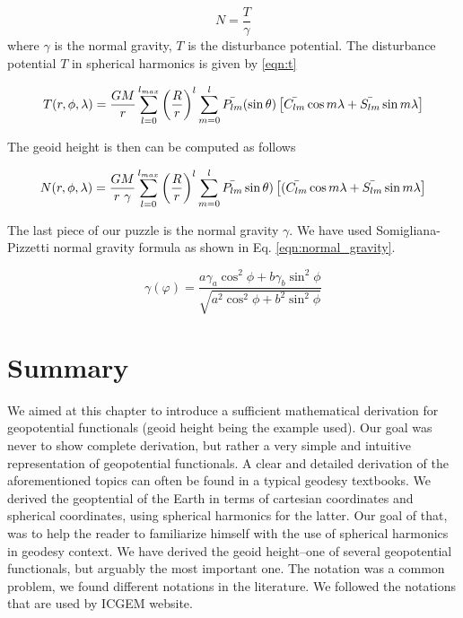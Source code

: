  \begin{equation}
 \label{eqn:brums}
 N = \frac{T}{\gamma}
 \end{equation}
 where $\gamma$ is the normal gravity, $T$ is the disturbance potential. The disturbance potential $T$ in spherical harmonics is given by \ref{eqn:t}
 
 \begin{equation}
 \label{eqn:t}
 T(r, \phi, \lambda) = \frac{GM}{r}\sum_{l=0}^{l_{max}}\left(\frac{R}{r}\right)^{l}\sum_{m=0}^{l}\bar{P_{lm}}(\sin \theta)\left[\bar{C_{lm}} \cos m \lambda \\
 + \bar{S_{lm}} \sin m \lambda\right]
 \end{equation}
 
 The geoid height is then can be computed as follows
 
  \begin{equation}
  \label{eqn:n}
  N(r, \phi, \lambda) = \frac{GM}{r\ \gamma}\sum_{l=0}^{l_{max}}\left(\frac{R}{r}\right)^{l}\sum_{m=0}^{l}\bar{P_{lm}}\sin \theta)\left[(\bar{C_{lm}} \cos m \lambda \\
  + \bar{S_{lm}} \sin m \lambda\right]
  \end{equation}
  
  The last piece of our puzzle is the normal gravity $\gamma$. We have used Somigliana-Pizzetti normal gravity formula as shown in Eq. \ref{eqn:normal_gravity}.
  
  \begin{equation}
  \label{eqn:normal_gravity}
  \gamma(\varphi) = \frac{a \gamma_a \cos^2 \phi + b \gamma_b \sin^2\phi}{\sqrt{a^2 \cos^2 \phi + b^2 \sin^2 \phi}}
  \end{equation} 
  
  
  \section{Summary}
  
  We aimed at this chapter to introduce a sufficient mathematical derivation for geopotential functionals (geoid height being the example used). Our goal was never to show complete derivation, but rather a very simple and intuitive representation of geopotential functionals. A clear and detailed derivation of the aforementioned topics can often be found in a typical geodesy textbooks. We derived the geoptential of the Earth in terms of cartesian coordinates and spherical coordinates, using spherical harmonics for the latter. Our goal of that, was to help the reader to familiarize himself with the use of spherical harmonics in geodesy context. We have derived the geoid height--one of several geopotential functionals, but arguably the most important one. The notation was a common problem, we found different notations in the literature. We followed the notations that are used by ICGEM website.